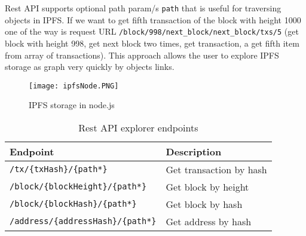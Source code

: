 Rest API supports optional path param/s \texttt{path} that is useful for traversing objects in IPFS. If we want to get fifth transaction of the block with height 1000 one of the way is request URL \texttt{/block/998/next\_block/next\_block/txs/5} (get block with height 998, get next block two times, get transaction, a get fifth item from array of transactions). This approach allows the user to explore IPFS storage as graph very quickly by objects links.

\begin{figure}[h]
    \centering
    \texttt{[image: ipfsNode.PNG]}
    \caption{IPFS storage in node.js}
    \label{nodeIPFS}
\end{figure}


\begin{table}[h]
    \centering
    \begin{tabular}{|l|l|}
    \hline
    Endpoint                           & Description                       \\ \hline
    \texttt{/tx/\{txHash\}/\{path*\}}           & Get transaction by hash  \\ \hline
    \texttt{/block/\{blockHeight\}/\{path*\}}   & Get block by height      \\ \hline
    \texttt{/block/\{blockHash\}/\{path*\}}     & Get block by hash        \\ \hline
    \texttt{/address/\{addressHash\}/\{path*\}} & Get address by hash      \\ \hline
    \end{tabular}
    \caption{Rest API explorer endpoints}
    \label{tab:explorerApiEndpoints}
\end{table}